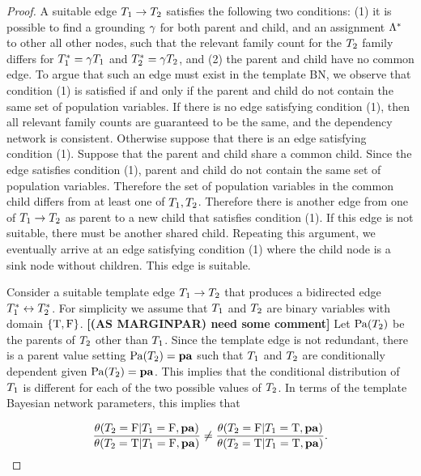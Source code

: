 \documentclass[runningheads,a4paper]{llncs}
\renewcommand{\marginpar}[1]{\fixneeded{(AS MARGINPAR) #1}}
\newcommand{\fixneeded}[1]{\textbf{[\footnotesize #1]}}
\begin{document}
\begin{proof}
A suitable edge $T_{1} \rightarrow T_{2}$ satisfies the following two conditions: (1) it is possible to find a grounding $\gamma$ for both parent and child, and an assignment $\Lambda^{*}\hspace{0.0ex}$ to other all other nodes, such that the relevant family count for the $T_{2}$ family differs for $T_{1}^{*}\hspace{0.0ex} = \gamma T_{1}$ 
and $T_{2}^{*}\hspace{0.0ex} = \gamma T_{2}$, and (2) the parent and child have no common edge. To argue that such an edge must exist in the template BN, we observe that condition (1) is satisfied if and only if the parent and child do not contain the same set of population variables. If there is no edge satisfying condition (1), then all relevant family counts are guaranteed to be the same, and the dependency network is consistent. Otherwise suppose that there is an edge satisfying condition (1). Suppose that the parent and child share a common child. Since the edge satisfies condition (1), parent and child do not contain the same set of population variables. Therefore the set of population variables in the common child differs from at least one of  $T_{1}, T_{2}$. Therefore there is another edge from one of  $T_{1} \rightarrow T_{2}$ as parent to a new child that satisfies condition (1). If this edge is not suitable, there must be another shared child. Repeating this argument, we eventually arrive at an edge satisfying condition (1) where the child node is a sink node without children. This edge is suitable.

Consider a suitable template edge $T_{1} \rightarrow T_{2}$ that produces a bidirected edge $T_{1}^{*}\hspace{0.0ex} \leftrightarrow T_{2}^{*}\hspace{0.0ex}$. For simplicity we assume that $T_{1}$ and $T_{2}$ are binary variables with domain $\{\mathrm{T},\mathrm{F}\}$. \marginpar{need some comment} Let $\mathrm{Pa}(T_{2})$ be the parents of $T_{2}$ other than $T_{1}$. Since the template edge is not redundant, there is a parent value setting $\mathrm{Pa}(T_{2}) = \mathbf{pa}$ such that $T_{1}$ and $T_{2}$ are conditionally dependent given $\mathrm{Pa}(T_{2}) = \mathbf{pa}$. This implies that the conditional distribution of $T_{1}$ is different for each of the two possible values of $T_{2}$. In terms of the template Bayesian network parameters, this implies that

\begin{equation} \label{eq:dependence}
\frac{\theta(T_{2} = \mathrm{F}|T_{1} = \mathrm{F},\mathbf{pa})}{\theta(T_{2} = \mathrm{T}|T_{1} = \mathrm{F},\mathbf{pa})} \neq \frac{\theta(T_{2} = \mathrm{F}|T_{1} = \mathrm{T},\mathbf{pa})}{\theta(T_{2} = \mathrm{T}|T_{1} = \mathrm{T},\mathbf{pa})}.
\end{equation}


\end{proof}
\end{document}
